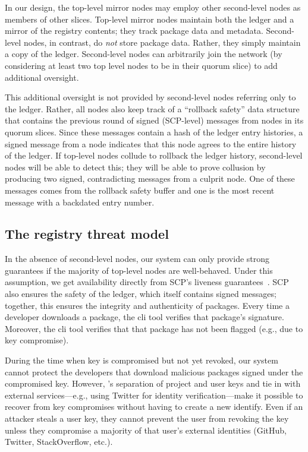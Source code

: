 In our design, the top-level mirror nodes may employ other second-level nodes
as members of other slices. Top-level mirror nodes maintain both the ledger and
a mirror of the registry contents; they track package data and metadata.
Second-level nodes, in contrast, do \emph{not} store package data. Rather, they
simply maintain a copy of the ledger. Second-level nodes can arbitrarily join
the network (by considering at least two top level nodes to be in their quorum
slice) to add additional oversight.

This additional oversight is not provided by second-level nodes referring only
to the ledger. Rather, all nodes also keep track of a ``rollback safety'' data
structure that contains the previous round of signed (SCP-level) messages from
nodes in its quorum slices. Since these messages contain a hash of the ledger
entry histories, a signed message from a node indicates that this node agrees
to the entire history of the ledger. If top-level nodes collude to rollback the
ledger history, second-level nodes will be able to detect this; they will be
able to prove collusion by producing two signed, contradicting messages from a
culprit node. One of these messages comes from the rollback safety buffer and
one is the most recent message with a backdated entry number. 

\subsection{The registry threat model}
In the absence of second-level nodes, our system can only provide strong
guarantees if the majority of top-level nodes are well-behaved. Under this
assumption, we get availability directly from SCP's liveness
guarantees~\cite{stellar}. SCP also ensures the safety of the ledger, which
itself contains signed messages; together, this ensures the integrity and
authenticity of packages. Every time a developer downloads a package, the
\spam{} cli tool verifies that package's signature. Moreover, the \spam{} cli
tool verifies that that package has not been flagged (e.g., due to key
compromise). 

During the time when key is compromised but not yet revoked, our system cannot
protect the developers that download malicious packages signed under the
compromised key. However, \spam's separation of project and user keys and tie
in with external services---e.g., using Twitter for identity
verification---make it possible to recover from key compromises without having
to create a new identify. Even if an attacker steals a user key, they cannot
prevent the user from revoking the key unless they compromise a majority of
that user's external identities (GitHub, Twitter, StackOverflow, etc.). 

